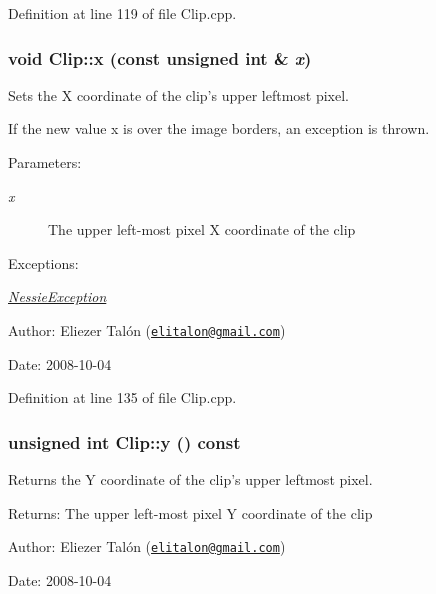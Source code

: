 Definition at line 119 of file Clip.cpp.\hypertarget{class_clip_7617cb2fcd294e990293e5bd4854f949}{
\subsubsection[x]{\setlength{\rightskip}{0pt plus 5cm}void Clip::x (const unsigned int \& {\em x})}}
\label{class_clip_7617cb2fcd294e990293e5bd4854f949}


Sets the X coordinate of the clip's upper leftmost pixel. 

If the new value x is over the image borders, an exception is thrown.

\begin{Desc}
\item[Parameters:]
\begin{description}
\item[{\em x}]The upper left-most pixel X coordinate of the clip\end{description}
\end{Desc}
\begin{Desc}
\item[Exceptions:]
\begin{description}
\item[{\em \hyperlink{class_nessie_exception}{NessieException}}]\end{description}
\end{Desc}
\begin{Desc}
\item[Author:]Eliezer Talón (\href{mailto:elitalon@gmail.com}{\tt elitalon@gmail.com}) \end{Desc}
\begin{Desc}
\item[Date:]2008-10-04 \end{Desc}


Definition at line 135 of file Clip.cpp.\hypertarget{class_clip_998a62506ffab457184ec7083cb154e4}{
\subsubsection[y]{\setlength{\rightskip}{0pt plus 5cm}unsigned int Clip::y () const}}
\label{class_clip_998a62506ffab457184ec7083cb154e4}


Returns the Y coordinate of the clip's upper leftmost pixel. 

\begin{Desc}
\item[Returns:]The upper left-most pixel Y coordinate of the clip\end{Desc}
\begin{Desc}
\item[Author:]Eliezer Talón (\href{mailto:elitalon@gmail.com}{\tt elitalon@gmail.com}) \end{Desc}
\begin{Desc}
\item[Date:]2008-10-04 \end{Desc}


